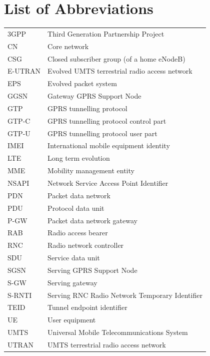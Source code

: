 \documentclass[12pt, a4paper]{article}
\begin{document}
\section*{List of Abbreviations}
\begin{tabular}{ p{4cm} l }
 3GPP & Third Generation Partnership Project \\
 CN & Core network \\
 CSG & Closed subscriber group (of a home eNodeB) \\
 E-UTRAN & Evolved UMTS terrestrial radio access network \\
 EPS & Evolved packet system \\
 GGSN & Gateway GPRS Support Node \\
 GTP & GPRS tunnelling protocol \\
 GTP-C & GPRS tunnelling protocol control part \\
 GTP-U & GPRS tunnelling protocol user part \\
 IMEI & International mobile equipment identity \\
 LTE & Long term evolution \\
 MME & Mobility management entity \\
 NSAPI & Network Service Access Point Identifier \\
 PDN & Packet data network \\
 PDU & Protocol data unit \\
 P-GW & Packet data network gateway \\
 RAB & Radio access bearer \\
 RNC & Radio network controller \\
 SDU & Service data unit \\
 SGSN & Serving GPRS Support Node \\
 S-GW & Serving gateway \\
 S-RNTI & Serving RNC Radio Network Temporary Identifier \\
 TEID & Tunnel endpoint identifier \\
 UE & User equipment \\
 UMTS & Universal Mobile Telecommunications System \\
 UTRAN & UMTS terrestrial radio access network \\


\end{tabular}

\clearpage
\end{document}
